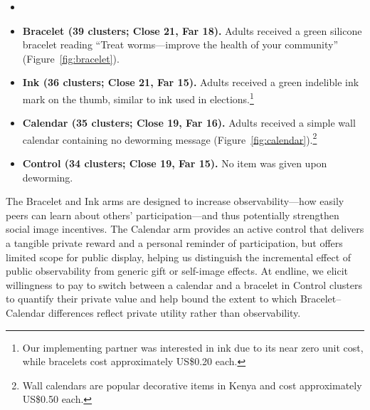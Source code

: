 \documentclass[12pt,a4paper]{article}
\begin{document}
\begin{itemize}  
\item[] \textbf{}
\item \textbf{Bracelet (39 clusters; Close 21, Far 18).}
  Adults received a green silicone bracelet reading ``Treat worms---improve the health of your community'' (Figure~\ref{fig:bracelet}).

  \item \textbf{Ink (36 clusters; Close 21, Far 15).}
  Adults received a green indelible ink mark on the thumb, similar to ink used in elections.\footnote{Our implementing partner was interested in ink due to its near zero unit cost, while bracelets cost approximately US\$0.20 each.}

  \item \textbf{Calendar (35 clusters; Close 19, Far 16).}
  Adults received a simple wall calendar containing no deworming message (Figure~\ref{fig:calendar}).\footnote{Wall calendars are popular decorative items in Kenya and cost approximately US\$0.50 each.}

  \item \textbf{Control (34 clusters; Close 19, Far 15).}
  No item was given upon deworming. \\
\end{itemize}

The Bracelet and Ink arms are designed to increase observability---how easily peers can learn about others' participation---and thus potentially strengthen social image incentives. The Calendar arm provides an active control that delivers a tangible private reward and a personal reminder of participation, but offers limited scope for public display, helping us distinguish the incremental effect of public observability from generic gift or self-image effects. At endline, we elicit willingness to pay to switch between a calendar and a bracelet in Control clusters to quantify their private value and help bound the extent to which Bracelet–Calendar differences reflect private utility rather than observability.
\end{document}
